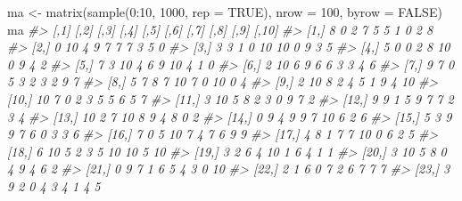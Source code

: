 \documentclass[
]{book}
\newenvironment{Shaded}{\begin{snugshade}}{\end{snugshade}}
\newcommand{\AttributeTok}[1]{\textcolor[rgb]{0.77,0.63,0.00}{#1}}
\newcommand{\CommentTok}[1]{\textcolor[rgb]{0.56,0.35,0.01}{\textit{#1}}}
\newcommand{\ConstantTok}[1]{\textcolor[rgb]{0.00,0.00,0.00}{#1}}
\newcommand{\DecValTok}[1]{\textcolor[rgb]{0.00,0.00,0.81}{#1}}
\newcommand{\FunctionTok}[1]{\textcolor[rgb]{0.00,0.00,0.00}{#1}}
\newcommand{\NormalTok}[1]{#1}
\newcommand{\OtherTok}[1]{\textcolor[rgb]{0.56,0.35,0.01}{#1}}
\newcommand{\SpecialCharTok}[1]{\textcolor[rgb]{0.00,0.00,0.00}{#1}}
\begin{document}
\begin{Shaded}
\begin{Highlighting}[]
\NormalTok{ma }\OtherTok{\textless{}{-}} \FunctionTok{matrix}\NormalTok{(}\FunctionTok{sample}\NormalTok{(}\DecValTok{0}\SpecialCharTok{:}\DecValTok{10}\NormalTok{, }\DecValTok{1000}\NormalTok{, }\AttributeTok{rep =} \ConstantTok{TRUE}\NormalTok{), }\AttributeTok{nrow =} \DecValTok{100}\NormalTok{, }\AttributeTok{byrow =} \ConstantTok{FALSE}\NormalTok{)}
\NormalTok{ma}
\CommentTok{\#\textgreater{}        [,1] [,2] [,3] [,4] [,5] [,6] [,7] [,8] [,9] [,10]}
\CommentTok{\#\textgreater{}   [1,]    8    0    2    7    5    5    1    0    2     8}
\CommentTok{\#\textgreater{}   [2,]    0   10    4    9    7    7    7    3    5     0}
\CommentTok{\#\textgreater{}   [3,]    3    3    1    0   10   10    0    9    3     5}
\CommentTok{\#\textgreater{}   [4,]    5    0    0    2    8   10    0    9    4     2}
\CommentTok{\#\textgreater{}   [5,]    7    3   10    4    6    9   10    4    1     0}
\CommentTok{\#\textgreater{}   [6,]    2   10    6    9    6    6    3    3    4     6}
\CommentTok{\#\textgreater{}   [7,]    9    7    0    5    3    2    3    2    9     7}
\CommentTok{\#\textgreater{}   [8,]    5    7    8    7   10    7    0   10    0     4}
\CommentTok{\#\textgreater{}   [9,]    2   10    8    2    4    5    1    9    4    10}
\CommentTok{\#\textgreater{}  [10,]   10    7    0    2    3    5    5    6    5     7}
\CommentTok{\#\textgreater{}  [11,]    3   10    5    8    2    3    0    9    7     2}
\CommentTok{\#\textgreater{}  [12,]    9    9    1    5    9    7    7    2    3     4}
\CommentTok{\#\textgreater{}  [13,]   10    2    7   10    8    9    4    8    0     2}
\CommentTok{\#\textgreater{}  [14,]    0    9    4    9    9    7   10    6    2     6}
\CommentTok{\#\textgreater{}  [15,]    5    3    9    9    7    6    0    3    3     6}
\CommentTok{\#\textgreater{}  [16,]    7    0    5   10    7    4    7    6    9     9}
\CommentTok{\#\textgreater{}  [17,]    4    8    1    7    7   10    0    6    2     5}
\CommentTok{\#\textgreater{}  [18,]    6   10    5    2    3    5   10   10    5    10}
\CommentTok{\#\textgreater{}  [19,]    3    2    6    4   10    1    6    4    1     1}
\CommentTok{\#\textgreater{}  [20,]    3   10    5    8    0    4    9    4    6     2}
\CommentTok{\#\textgreater{}  [21,]    0    9    7    1    6    5    4    3    0    10}
\CommentTok{\#\textgreater{}  [22,]    2    1    6    0    7    2    6    7    7     7}
\CommentTok{\#\textgreater{}  [23,]    3    9    2    0    4    3    4    1    4     5}

\end{Highlighting}
\end{Shaded}
\end{document}
